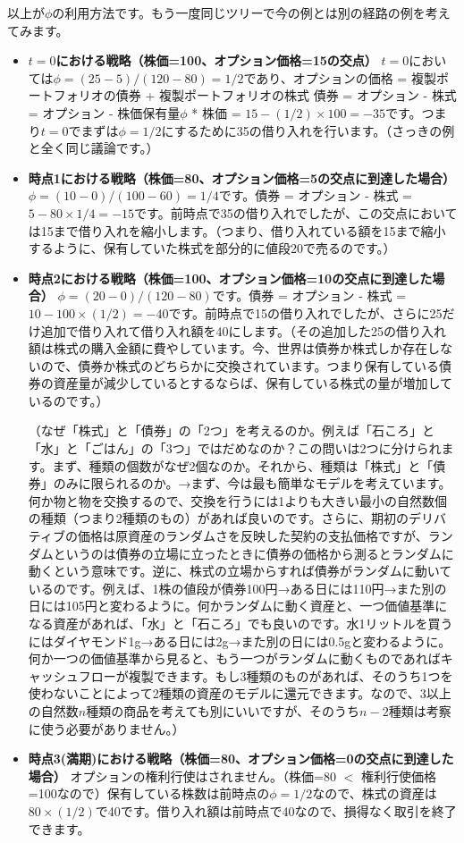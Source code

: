 \documentclass[uplatex,a4j,12pt,dvipdfmx]{jsarticle}
\begin{document}
以上が$\phi$の利用方法です。もう一度同じツリーで今の例とは別の経路の例を考えてみます。

\begin{itemize}
	\item \textbf{$t=0$における戦略（株価=100、オプション価格=15の交点）}
	      $t=0$においては$\phi = (25 - 5) / ( 120 - 80 ) = 1/2$であり、オプションの価格 = 複製ポートフォリオの債券 + 複製ポートフォリオの株式 債券 = オプション - 株式 = オプション - 株価保有量$\phi$ * 株価 = $15 - (1/2) \times 100 = -35$です。つまり$t=0$でまずは$\phi=1/2$にするために35の借り入れを行います。（さっきの例と全く同じ議論です。）

	\item \textbf{時点1における戦略（株価=80、オプション価格=5の交点に到達した場合）}
	      $\phi = (10 - 0) / ( 100 - 60 ) = 1/4$です。債券 = オプション - 株式 = $5 - 80 \times 1/4 = -15$です。前時点で35の借り入れでしたが、この交点においては15まで借り入れを縮小します。（つまり、借り入れている額を15まで縮小するように、保有していた株式を部分的に値段20で売るのです。）

	\item \textbf{時点2における戦略（株価=100、オプション価格=10の交点に到達した場合）}
	      $\phi = ( 20 - 0 ) / ( 120 - 80 )$です。債券 = オプション - 株式 = $10 - 100 \times (1/2) = -40$です。前時点で15の借り入れでしたが、さらに25だけ追加で借り入れて借り入れ額を40にします。（その追加した25の借り入れ額は株式の購入金額に費やしています。今、世界は債券か株式しか存在しないので、債券か株式のどちらかに交換されています。つまり保有している債券の資産量が減少しているとするならば、保有している株式の量が増加しているのです。）

	      （なぜ「株式」と「債券」の「2つ」を考えるのか。例えば「石ころ」と「水」と「ごはん」の「3つ」ではだめなのか？この問いは2つに分けられます。まず、種類の個数がなぜ2個なのか。それから、種類は「株式」と「債券」のみに限られるのか。→まず、今は最も簡単なモデルを考えています。何か物と物を交換するので、交換を行うには1よりも大きい最小の自然数個の種類（つまり2種類のもの）があれば良いのです。さらに、期初のデリバティブの価格は原資産のランダムさを反映した契約の支払価格ですが、ランダムというのは債券の立場に立ったときに債券の価格から測るとランダムに動くという意味です。逆に、株式の立場からすれば債券がランダムに動いているのです。例えば、1株の値段が債券100円→ある日には110円→また別の日には105円と変わるように。何かランダムに動く資産と、一つ価値基準になる資産があれば、「水」と「石ころ」でも良いのです。水1リットルを買うにはダイヤモンド1g→ある日には2g→また別の日には0.5gと変わるように。何か一つの価値基準から見ると、もう一つがランダムに動くものであればキャッシュフローが複製できます。もし3種類のものがあれば、そのうち1つを使わないことによって2種類の資産のモデルに還元できます。なので、3以上の自然数$n$種類の商品を考えても別にいいですが、そのうち$n-2$種類は考察に使う必要がありません。）

	\item \textbf{時点3(満期)における戦略（株価=80、オプション価格=0の交点に到達した場合）}
	      オプションの権利行使はされません。（株価=80 $<$ 権利行使価格=100なので）保有している株数は前時点の$\phi=1/2$なので、株式の資産は$80 \times (1/2)$で40です。借り入れ額は前時点で40なので、損得なく取引を終了できます。
\end{itemize}
\end{document}
